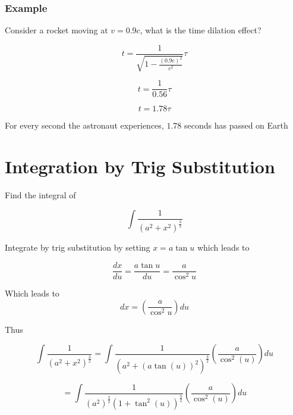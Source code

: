 \documentclass[14pt]{memoir}
\begin{document}
\subsection{Example}
Consider a rocket moving at $v = 0.9c$, what is the time dilation effect?

\begin{equation}
t = \frac{1}{\sqrt{1 - \frac{(0.9c)^2}{c^2}}} \tau
\end{equation}

\begin{equation}
t = \frac{1}{0.56} \tau
\end{equation}

\begin{equation}
t = 1.78 \tau
\end{equation}

For every second the astronaut experiences, $1.78$ seconds has passed on Earth

\appendix

\chapter{Integration by Trig Substitution}
\label{sec:trigsub}

Find the integral of 

\begin{equation}
\int \frac{1}{(a^2 + x^2)^{\frac{3}{2}}}
\end{equation}

Integrate by trig substitution by setting $x = a\tan{u}$ which leads to 

\begin{equation}
\frac{dx}{du} = \frac{a \tan{u}}{du} = \frac{a}{\cos^2{u}}
\end{equation}

Which leads to 
\begin{equation}
dx = ( \frac{a}{\cos^2{u}}) du 
\end{equation}

Thus

\begin{equation}
\int \frac{1}{(a^2 + x^2)^{\frac{3}{2}}} =  \int \frac{1}{(a^2 + (a\tan{(u)})^2)^{\frac{3}{2}}} ( \frac{a}{\cos^2{(u)}}) du
\end{equation}

\begin{equation}
=  \int \frac{1}{(a^2)^{\frac{3}{2}} (1 + \tan^2{(u)})^{\frac{3}{2}}} ( \frac{a}{\cos^2{(u)}}) du
\end{equation}
\end{document}
